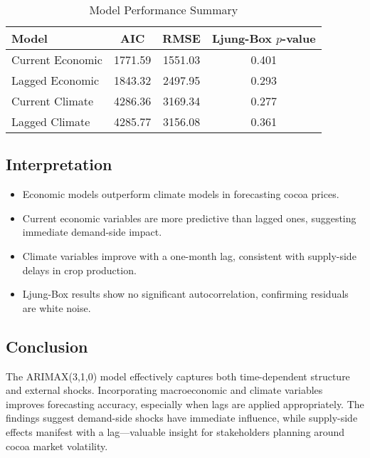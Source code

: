 \begin{table}[h!]
\centering
\caption{Model Performance Summary}
\begin{tabular}{lccc}
\toprule
\textbf{Model} & \textbf{AIC} & \textbf{RMSE} & \textbf{Ljung-Box $p$-value} \\
\midrule
Current Economic & 1771.59 & 1551.03 & 0.401 \\
Lagged Economic & 1843.32 & 2497.95 & 0.293 \\
Current Climate & 4286.36 & 3169.34 & 0.277 \\
Lagged Climate & 4285.77 & 3156.08 & 0.361 \\
\bottomrule
\end{tabular}
\end{table}

\subsection{Interpretation}

\begin{itemize}
    \item Economic models outperform climate models in forecasting cocoa prices.
    \item Current economic variables are more predictive than lagged ones, suggesting immediate demand-side impact.
    \item Climate variables improve with a one-month lag, consistent with supply-side delays in crop production.
    \item Ljung-Box results show no significant autocorrelation, confirming residuals are white noise.
\end{itemize}

\subsection{Conclusion}

The ARIMAX(3,1,0) model effectively captures both time-dependent structure and external shocks. Incorporating macroeconomic and climate variables improves forecasting accuracy, especially when lags are applied appropriately. The findings suggest demand-side shocks have immediate influence, while supply-side effects manifest with a lag—valuable insight for stakeholders planning around cocoa market volatility.